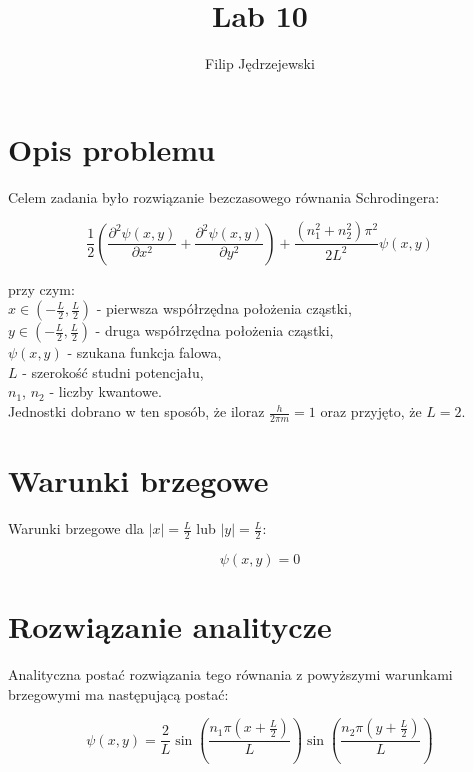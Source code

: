\documentclass{article}
\title{Lab 10}
\author{Filip Jędrzejewski}
\begin{document}
	\maketitle
	
	
	\section*{Opis problemu}

	Celem zadania było rozwiązanie bezczasowego równania Schrodingera:

	\begin{equation}
		\frac{1}{2} \left( \frac{\partial^2 \psi (x,y)}{\partial x^2} + \frac{\partial^2 \psi (x,y)}{\partial y^2} \right) + \frac{(n_1^2 + n_2^2) \pi ^2}{2L^2} \psi (x,y)
	\end{equation}

	przy czym:  \\
	$x \in (-\frac{L}{2}, \frac{L}{2})$ - pierwsza współrzędna położenia cząstki, \\
	$y \in (-\frac{L}{2}, \frac{L}{2})$ - druga współrzędna położenia cząstki, \\
	$\psi (x,y)$ - szukana funkcja falowa, \\
	$L$ - szerokość studni potencjału, \\
	$n_1$, $n_2$ - liczby kwantowe. \\

	Jednostki dobrano w ten sposób, że iloraz $\frac{h}{2\pi m} = 1$ oraz przyjęto, że $L = 2$. 

	\section*{Warunki brzegowe}

	Warunki brzegowe dla $|x| = \frac{L}{2}$ lub $|y| = \frac{L}{2}$:

	\begin{equation}
		\psi (x,y) = 0
	\end{equation}

	\section*{Rozwiązanie analitycze}

	Analityczna postać rozwiązania tego równania z powyższymi warunkami brzegowymi ma następującą postać:

	\begin{equation}
		\psi (x, y) = \frac{2}{L} \sin \left( \frac{n_1 \pi (x+\frac{L}{2})}{L} \right) \sin \left( \frac{n_2 \pi (y+\frac{L}{2})}{L} \right)
	\end{equation}
\end{document}
